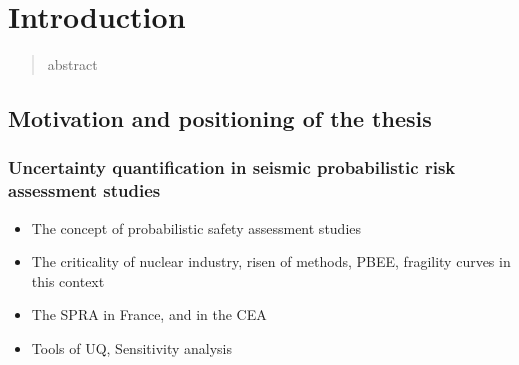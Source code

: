 

\chapter{Introduction}


\begin{abstract}
abstract
\end{abstract}

\minitoc


\section{Motivation and positioning of the thesis}

\subsection{Uncertainty quantification in seismic probabilistic risk assessment studies}





\begin{itemize}
    \item The concept of probabilistic safety assessment studies
    \item The criticality of nuclear industry, risen of methods, PBEE, fragility curves in this context
    \item The SPRA in France, and in the CEA %
    \item Tools of UQ, Sensitivity analysis
\end{itemize}



